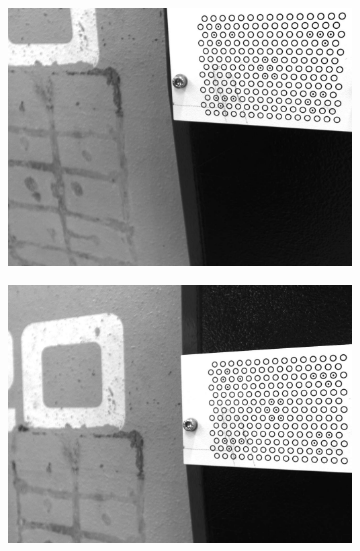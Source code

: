 \begin{figure}[h]
\begin{subfigure}{0.32\textwidth}
        \centering
        \includegraphics[width=\textwidth]{figures/001calibration/calibration2.PNG}
    \end{subfigure}
    \vspace{0.1cm}
    \begin{subfigure}{0.32\textwidth}
        \centering
        \includegraphics[width=\textwidth]{figures/001calibration/calibration3.png}
    \end{subfigure}\hspace{0cm}
    \begin{subfigure}{0.32\textwidth}
        \centering

\end{subfigure}
\end{figure}
